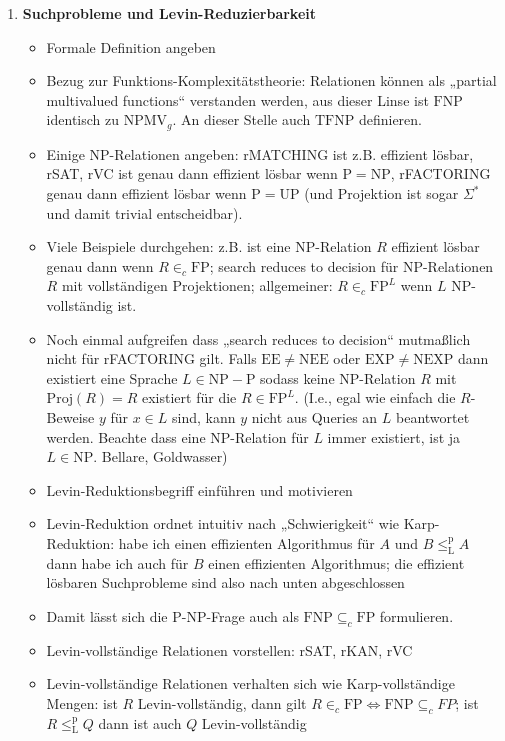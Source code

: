 \documentclass[nofonts]{uebung}
\def\P{\ensuremath{\mathrm{P}}}
\def\NP{\ensuremath{\mathrm{NP}}}
\def\FP{\ensuremath{\mathrm{FP}}}
\def\UP{\ensuremath{\mathrm{UP}}}
\begin{document}
\begin{enumerate}[label*=\arabic*.]
\begin{enumerate}[label*=\arabic*.]
            \item \textbf{Suchprobleme und Levin-Reduzierbarkeit}
                \begin{itemize}
                    \item Formale Definition angeben
                    \item Bezug zur Funktions-Komplexitätstheorie: Relationen können als „partial multivalued functions“ verstanden werden, aus dieser Linse ist $\mathrm{FNP}$ identisch zu $\mathrm{NPMV}_g$. An dieser Stelle auch $\mathrm{TFNP}$ definieren.
                    \item Einige NP-Relationen angeben: rMATCHING ist z.B. effizient lösbar, rSAT, rVC ist genau dann effizient lösbar wenn $\P=\NP$, rFACTORING genau dann effizient lösbar wenn $\P=\UP$ (und Projektion ist sogar $\Sigma^*$ und damit trivial entscheidbar).
                    \item Viele Beispiele durchgehen: z.B. ist eine NP-Relation $R$ effizient lösbar genau dann wenn $R\in_c \FP$; search reduces to decision für NP-Relationen $R$ mit vollständigen Projektionen; allgemeiner: $R\in_c\FP^L$ wenn $L$ NP-vollständig ist.
                    \item Noch einmal aufgreifen dass „search reduces to decision“ mutmaßlich nicht für rFACTORING gilt. Falls $\mathrm{EE\neq NEE}$ oder $\mathrm{EXP\neq NEXP}$ dann existiert eine Sprache $L\in\NP - \P$ sodass keine NP-Relation $R$ mit $\mathrm{Proj}(R)=R$ existiert für die $R\in\FP^L$. (I.e., egal wie einfach die $R$-Beweise $y$ für $x\in L$ sind, kann $y$ nicht aus Queries an $L$ beantwortet werden. Beachte dass eine NP-Relation für $L$ immer existiert, ist ja $L\in\NP$. Bellare, Goldwasser)
                    \item Levin-Reduktionsbegriff einführen und motivieren
                    \item Levin-Reduktion ordnet intuitiv nach „Schwierigkeit“ wie Karp-Reduktion: habe ich einen effizienten Algorithmus für $A$ und $B\leq_\mathrm L^\mathrm p A$ dann habe ich auch für $B$ einen effizienten Algorithmus; die effizient lösbaren Suchprobleme sind also nach unten abgeschlossen
                    \item Damit lässt sich die P-NP-Frage auch als $\mathrm{FNP}\subseteq_c \mathrm{FP}$ formulieren.
                    \item Levin-vollständige Relationen vorstellen: rSAT, rKAN, rVC
                    \item Levin-vollständige Relationen verhalten sich wie Karp-vollständige Mengen: ist $R$ Levin-vollständig, dann gilt $R\in_c\mathrm{FP} \iff \mathrm{FNP}\subseteq_c {FP}$; ist $R\leq_\mathrm L^\mathrm p Q$ dann ist auch $Q$ Levin-vollständig

\end{itemize}
\end{enumerate}
\end{enumerate}
\end{document}
